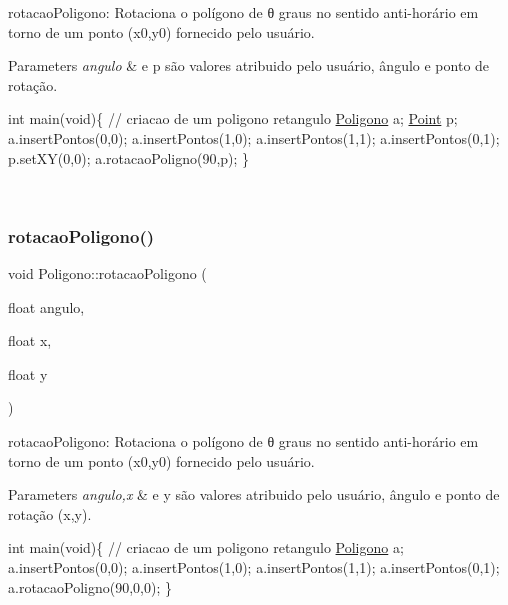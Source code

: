 rotacao\+Poligono\+: Rotaciona o polígono de θ graus no sentido anti-\/horário em torno de um ponto (x0,y0) fornecido pelo usuário. 


\begin{DoxyParams}{Parameters}
{\em angulo} & e p são valores atribuido pelo usuário, ângulo e ponto de rotação. 
\begin{DoxyPre}
int main(void)\{
// criacao de um poligono retangulo
   \mbox{\hyperlink{class_poligono}{Poligono}} a;
   \mbox{\hyperlink{class_point}{Point}} p;
   a.insertPontos(0,0);
   a.insertPontos(1,0);
   a.insertPontos(1,1);
   a.insertPontos(0,1);
   p.setXY(0,0);
   a.rotacaoPoligno(90,p);
\}
\end{DoxyPre}
 \\
\hline
\end{DoxyParams}
\mbox{\label{class_poligono_a16fcba48d87f60b030b61a54fd430fdd}} 
\subsubsection{\texorpdfstring{rotacao\+Poligono()}{rotacaoPoligono()}\hspace{0.1cm}{\footnotesize\ttfamily [2/2]}}
{\footnotesize\ttfamily void Poligono\+::rotacao\+Poligono (\begin{DoxyParamCaption}\item[{float}]{angulo,  }\item[{float}]{x,  }\item[{float}]{y }\end{DoxyParamCaption})}



rotacao\+Poligono\+: Rotaciona o polígono de θ graus no sentido anti-\/horário em torno de um ponto (x0,y0) fornecido pelo usuário. 


\begin{DoxyParams}{Parameters}
{\em angulo,x} & e y são valores atribuido pelo usuário, ângulo e ponto de rotação (x,y). 
\begin{DoxyPre}
int main(void)\{
// criacao de um poligono retangulo
   \mbox{\hyperlink{class_poligono}{Poligono}} a;
   a.insertPontos(0,0);
   a.insertPontos(1,0);
   a.insertPontos(1,1);
   a.insertPontos(0,1);
   a.rotacaoPoligno(90,0,0);
\}
\end{DoxyPre}
 \\
\hline
\end{DoxyParams}
\mbox{\label{class_poligono_a4d757f52ba9366ab13537fb19b363e1e}} 

